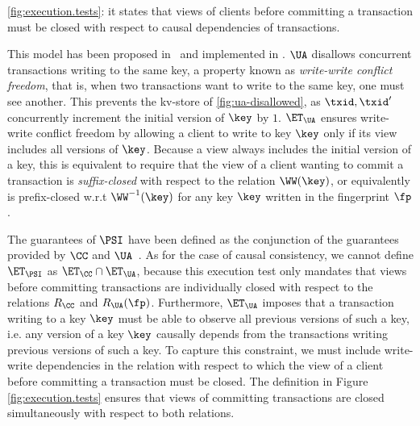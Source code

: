 \ref{fig:execution.tests}: it states that views of clients before committing a transaction must be closed with respect to 
causal dependencies of transactions.

This model has been proposed in~\cite{framework-concur} 
and implemented in \cite{rola}.
$\UA$ disallows concurrent transactions writing to the same key,
a property known as \emph{write-write conflict freedom}, that is, 
when two transactions want to write to the same key, one must see another.
This prevents the kv-store of \cref{fig:ua-disallowed},
as $\txid, \txid'$ concurrently increment the initial version of $\key$ by $1$.
$\ET_\UA$ ensures write-write conflict freedom by allowing a client to write to key $\key$
only if its view includes all versions of $\key$. Because a view always includes the 
initial version of a key, this is equivalent to require that the view of a client wanting 
to commit a transaction is \emph{suffix-closed} with respect to the relation $\WW(\key)$, 
or equivalently is prefix-closed w.r.t $\WW^{-1}(\key)$ for any key $\key$ written in the 
fingerprint $\fp$.

The guarantees of $\PSI$ have been defined as the conjunction of the guarantees provided by $\CC$ and $\UA$~\cite{framework-concur}. 
As for the case of causal consistency, we cannot define $\ET_{\PSI}$ as $\ET_{\CC} \cap \ET_{\UA}$, because 
this execution test only mandates that views before committing transactions are individually closed with respect to 
the relations $R_{\CC}$ and $R_{\UA}(\fp)$. Furthermore, $\ET_{\UA}$ imposes that a transaction writing 
to a key $\key$ must be able to observe all previous versions of such a key, i.e. any version of a key $\key$ 
causally depends from the transactions writing previous versions of such a key. To capture this constraint, 
we must include write-write dependencies in the relation with respect to which the view of a client before committing 
a transaction must be closed.
The definition in Figure \ref{fig:execution.tests} ensures that 
views of committing transactions are closed simultaneously with respect to both relations.

